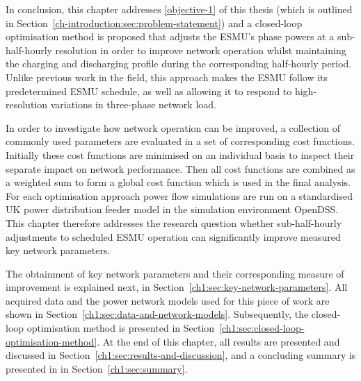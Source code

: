 In conclusion, this chapter addresses \ref{objective-1} of this thesis (which is outlined in Section~\ref{ch-introduction:sec:problem-statement}) and a closed-loop optimisation method is proposed that adjusts the ESMU's phase powers at a sub-half-hourly resolution in order to improve network operation whilst maintaining the charging and discharging profile during the corresponding half-hourly period.
Unlike previous work in the field, this approach makes the ESMU follow its  predetermined ESMU schedule, as well as allowing it to respond to high-resolution variations in three-phase network load.

In order to investigate how network operation can be improved, a collection of commonly used parameters are evaluated in a set of corresponding cost functions.
Initially these cost functions are minimised on an individual basis to inspect their separate impact on network performance.
Then all cost functions are combined as a weighted sum to form a global cost function which is used in the final analysis.
For each optimisation approach power flow simulations are run on a standardised UK power distribution feeder model in the simulation environment OpenDSS.
This chapter therefore addresses the research question whether sub-half-hourly adjustments to scheduled ESMU operation can significantly improve measured key network parameters.

The obtainment of key network parameters and their corresponding measure of improvement is explained next, in Section~\ref{ch1:sec:key-network-parameters}.
All acquired data and the power network models used for this piece of work are shown in Section~\ref{ch1:sec:data-and-network-models}.
Subsequently, the closed-loop optimisation method is presented in Section~\ref{ch1:sec:closed-loop-optimisation-method}.
At the end of this chapter, all results are presented and discussed in Section~\ref{ch1:sec:results-and-discussion}, and a concluding summary is presented in in Section~\ref{ch1:sec:summary}.
